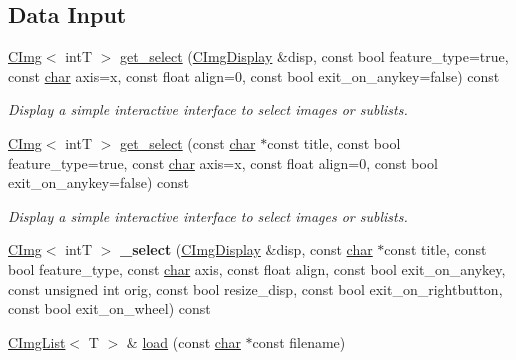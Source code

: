 \subsection*{Data Input}
\begin{DoxyCompactItemize}
\item 
\hyperlink{structcimg__library__suffixed_1_1CImg}{C\+Img}$<$ intT $>$ \hyperlink{structcimg__library__suffixed_1_1CImgList_abd59bf7e6c16840d80f47f57a4a30f3b}{get\+\_\+select} (\hyperlink{structcimg__library__suffixed_1_1CImgDisplay}{C\+Img\+Display} \&disp, const bool feature\+\_\+type=true, const \hyperlink{classchar}{char} axis=\textquotesingle{}x\textquotesingle{}, const float align=0, const bool exit\+\_\+on\+\_\+anykey=false) const
\begin{DoxyCompactList}\small\item\em Display a simple interactive interface to select images or sublists. \end{DoxyCompactList}\item 
\hyperlink{structcimg__library__suffixed_1_1CImg}{C\+Img}$<$ intT $>$ \hyperlink{structcimg__library__suffixed_1_1CImgList_a1159f1e73775d566e9dd7aa2a6f4bcac}{get\+\_\+select} (const \hyperlink{classchar}{char} $\ast$const title, const bool feature\+\_\+type=true, const \hyperlink{classchar}{char} axis=\textquotesingle{}x\textquotesingle{}, const float align=0, const bool exit\+\_\+on\+\_\+anykey=false) const
\begin{DoxyCompactList}\small\item\em Display a simple interactive interface to select images or sublists. \end{DoxyCompactList}\item 
\mbox{\label{structcimg__library__suffixed_1_1CImgList_af8a6b01f20b2d459e5abe6b99836ea9a}} 
\hyperlink{structcimg__library__suffixed_1_1CImg}{C\+Img}$<$ intT $>$ {\bfseries \+\_\+select} (\hyperlink{structcimg__library__suffixed_1_1CImgDisplay}{C\+Img\+Display} \&disp, const \hyperlink{classchar}{char} $\ast$const title, const bool feature\+\_\+type, const \hyperlink{classchar}{char} axis, const float align, const bool exit\+\_\+on\+\_\+anykey, const unsigned int orig, const bool resize\+\_\+disp, const bool exit\+\_\+on\+\_\+rightbutton, const bool exit\+\_\+on\+\_\+wheel) const
\item 
\hyperlink{structcimg__library__suffixed_1_1CImgList}{C\+Img\+List}$<$ T $>$ \& \hyperlink{structcimg__library__suffixed_1_1CImgList_a63bd67d8dd2301933df7decb4612916e}{load} (const \hyperlink{classchar}{char} $\ast$const filename)

\end{DoxyCompactItemize}
